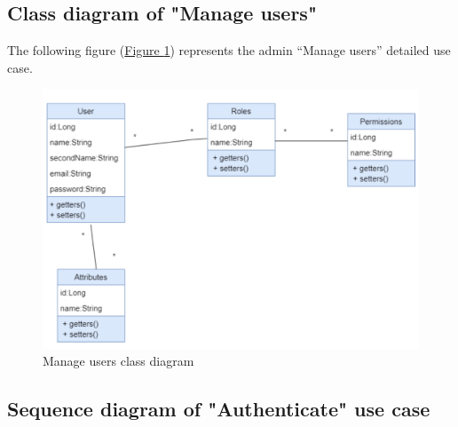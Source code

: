\vspace*{5cm}

\subsection{Class diagram of "Manage users"}

The following figure (\hyperref[fig:diagram-class-manage_users]{Figure \ref{fig:diagram-class-manage_users}})  represents the admin ``Manage users'' detailed use case.
\begin{figure}[h]
  \center
  \includegraphics[width=16cm]{./chapters/sprint1/user_diagram.png}
  \caption{Manage users class diagram}
  \label{fig:diagram-class-manage_users}
\end{figure}

\subsection{Sequence diagram of "Authenticate" use case}


